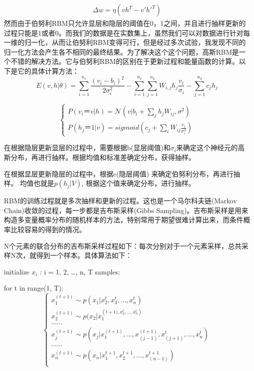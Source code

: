 	\begin{align}
	\Delta w = \eta(vh^T - v\prime {h\prime}^T)
	\end{align}
	然而由于伯努利RBM只允许显层和隐层的阈值在0，1之间，并且进行抽样更新的过程只能是1或者0。而我们的数据是在实数集上，虽然我们可以对数据进行针对每一维的归一化，从而让伯努利RBM变得可行，但是经过多次试验，我发现不同的归一化方法会产生各不相同的最终结果。为了解决这个这个问题，高斯RBM是一个不错的解决方法。它与伯努利RBM的区别在于更新过程和能量函数的计算。以下是它的具体计算方法：
	\begin{equation}
	E(v,h | \theta) = \sum\limits_{i=1}^{n_v}\frac{(v_i - b_i)^2}{2\sigma_i^2} - \sum\limits_{i=1}^{n_v}\sum\limits_{j=1}^{n_h} W_{i,j}h_j\frac{v_i}{\sigma_i} - \sum\limits_{j=1}^{n_h}c_jh_j
	\end{equation}
	
	\begin{equation}
	\begin{cases}
	P(v_i ＝ v|h) = \mathcal{N}(v | b_i + \sum\limits_{j}h_jW_{ij}, \sigma^2)\\
	P(h_j ＝ 1|v) = sigmoid(c_j + \sum\limits_i W_{ij} \frac{v_i}{\sigma_i^2})
	\end{cases}
	\end{equation}
	
	在根据隐层更新显层的过程中，需要根据b(显层阈值)和$\sigma_i$来确定这个神经元的高斯分布，再进行抽样。根据均值和标准差确定分布，获得抽样。
	
	在根据显层更新隐层的过程中，根据c(隐层阈值) 来确定伯努利分布，再进行抽样。 均值也就是$p(h_j| V)$, 根据这个值来确定分布，进行抽样。
	
	RBM的训练过程就是多次抽样和更新的过程。这也是一个马尔科夫链(Markov Chain)收敛的过程，每一步都是吉布斯采样(Gibbs Sampling)。吉布斯采样是用来构造多变量概率分布的随机样本的方法，特别常用于期望很难计算出来，而条件概率比较容易的得到的情况。
	
	N个元素的联合分布的吉布斯采样过程如下：每次分别对于一个元素采样，总共采样N次，就得到一个样本。具体算法如下：
	
	initialize $x_i$ : i = 1, 2, …, n, T samples:
	
	for t in range(1, T):\\

	\begin{equation}
	\begin{cases}
		x_1^{(t+1)} \sim p(x_1 | x_2^t, x_3^t,…, x_n^t)\\
		x_2^{(t+1)} \sim p(x_2 | x_1^({t+1)}, x_3^t,…, x_n^t)\\
		……\\
		x_j^{(t+1)} \sim p(x_j | x_1^{(t+1)},…,x_{(j-1)}^{(t+1)},x_{(j+1)}^t,…, x_n^t)\\
		……\\
		x_n^{(t+1)} \sim p(x_n | x_1^{t+1}, x_2^{t+1},…, x_{(n-1)}^{t+1})\\
	\end{cases}
	\end{equation}
	
